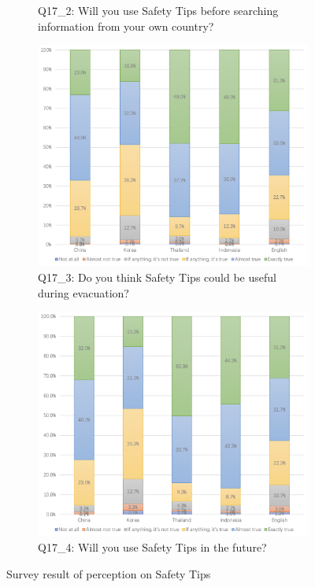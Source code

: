 \begin{figure}[h]
\begin{subfigure}{0.48\textwidth}
  \centering
  \caption{Q17\_2: Will you use Safety Tips before searching information from your own country?}
  \label{fig16}
  \end{subfigure}
  \begin{subfigure}{0.48\textwidth}
  \includegraphics[width=\linewidth]{Figure/Figure17.jpg}
  \centering
  \caption{Q17\_3: Do you think Safety Tips could be useful during evacuation?}
  \label{fig17}
  \end{subfigure}\hfill
  \begin{subfigure}{0.48\textwidth}
  \includegraphics[width=\linewidth]{Figure/Figure18.jpg}
  \centering
  \caption{Q17\_4: Will you use Safety Tips in the future?}
  \label{fig18}
  \end{subfigure}
  \caption{Survey result of perception on Safety Tips}
\end{figure}



